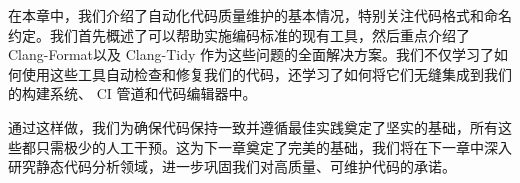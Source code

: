 
在本章中，我们介绍了自动化代码质量维护的基本情况，特别关注代码格式和命名约定。我们首先概述了可以帮助实施编码标准的现有工具，然后重点介绍了 Clang-Format以及 Clang-Tidy 作为这些问题的全面解决方案。我们不仅学习了如何使用这些工具自动检查和修复我们的代码，还学习了如何将它们无缝集成到我们的构建系统、 CI 管道和代码编辑器中。

通过这样做，我们为确保代码保持一致并遵循最佳实践奠定了坚实的基础，所有这些都只需极少的人工干预。这为下一章奠定了完美的基础，我们将在下一章中深入研究静态代码分析领域，进一步巩固我们对高质量、可维护代码的承诺。
